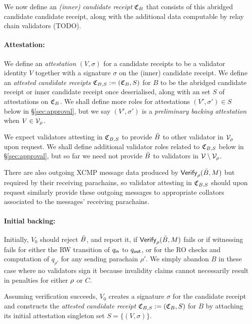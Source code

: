 We now define an {\em (inner) candidate receipt} $\mathfrak{C}_B$ that consists of this abridged candidate candidate receipt, along with the additional data computable by relay chain validators (TODO).

\smallskip\paragraph{Attestation:}

We define an {\em attestation} $(V,\sigma)$ for a candidate receipts to be a validator identity $V$ together with a signature $\sigma$ on the (inner) candidate receipt.  We define an {\em attested candidate receipts} $\mathfrak{C}_{B,S} := (\mathfrak{C}_B,S)$ for $B$ to be the abridged candidate receipt or inner candidate receipt once deserialised, along with an set $S$ of attestations on $\mathfrak{C}_B$.  We shall define more roles for attestations $(V',\sigma') \in S$ below in \S\ref{sec:approval}, but we say $(V',\sigma')$ is a {\em preliminary backing attestation} when $V \in \mathcal{V}_{\rho}$. 

We expect validators attesting in $\mathfrak{C}_{B,S}$ to provide $\bar{B}$ to other validator in $\mathcal{V}_{\rho}$ upon request.  We shall define additional validator roles related to $\mathfrak{C}_{B,S}$ below in \S\ref{sec:approval}, but so far we need not provide $\bar{B}$ to validators in $\mathcal{V} \setminus \mathcal{V}_{\rho}$.

There are also outgoing XCMP message data produced by $\mathsf{Verify}_{\rho}(\bar{B},M)$ but required by their receiving parachains, so validator attesting in $\mathfrak{C}_{B,S}$ should upon request similarly provide these outgoing messages to appropriate collators associated to the messages' receiving parachains. 

\smallskip\paragraph{Initial backing:}

Initially, $V_0$ should reject $\bar{B}$, and report it, if $\mathsf{Verify}_{\rho}(\bar{B},M)$ fails or if witnessing fails for either the RW transition of $q_{\mathsf{in}}$ to $q_{\mathsf{out}}$, or for the RO checks and computation of $q_{\rho'}$ for any sending parachain $\rho'$.  We simply abandon $B$ in these case where no validators sign it because invalidity claims cannot necessarily result in penalties for either $\rho$ or $C$.  

Assuming verification succeeds, $V_0$ creates a signature $\sigma$ for the candidate receipt and constructs the {\em attested candidate receipt} $\mathfrak{C}_{B,S} := (\mathfrak{C}_B,S)$ for $B$ by attaching its initial attestation singleton set $S = \{ (V,\sigma) \}$.

